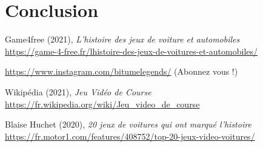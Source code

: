\documentclass[11pt,a4paper]{article}
\begin{document}
\section{Conclusion}
\clearpage

\begin{thebibliography}{9}
  Game4free (2021), \emph{L'histoire des jeux de voiture et automobiles} \\
  \url{https://game-4-free.fr/lhistoire-des-jeux-de-voitures-et-automobiles/}

  \url{https://www.instagram.com/bitumelegends/} (Abonnez vous !)

  Wikipédia (2021), \emph{Jeu Vidéo de Course} \\
  \url{https://fr.wikipedia.org/wiki/Jeu_video_de_course}

  Blaise Huchet (2020), \emph{20 jeux de voitures qui ont marqué l'histoire}\\
  \url{https://fr.motor1.com/features/408752/top-20-jeux-video-voitures/}

  
\end{thebibliography}
\end{document}
